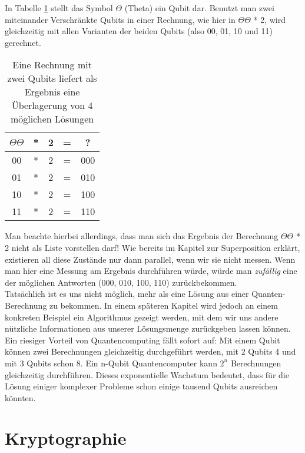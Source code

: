 \documentclass[12pt]{IEEEtran}
\begin{document}
In Tabelle \ref{tab:QubitRechnung} stellt das Symbol \(\Theta\) (Theta) ein Qubit dar. Benutzt man zwei miteinander Verschränkte Qubits in einer Rechnung, wie hier in \(\Theta\Theta\) * 2, wird gleichzeitig mit allen Varianten der beiden Qubits (also 00, 01, 10 und 11) gerechnet.

\begin{table}
    \centering
    \caption{Eine Rechnung mit zwei Qubits liefert als Ergebnis eine Überlagerung von 4 möglichen Lösungen}
    \label{tab:QubitRechnung}
    \begin{tabular}{ccccc}
        \(\Theta\Theta\) & * & 2 & = & ?\\
        \hline
        00 & * & 2 & = & 000\\
        01 & * & 2 & = & 010\\
        10 & * & 2 & = & 100\\
        11 & * & 2 & = & 110\\
    \end{tabular}
\end{table}

Man beachte hierbei allerdings, dass man sich das Ergebnis der Berechnung \(\Theta\Theta\) * 2 nicht als Liste vorstellen darf! Wie bereits im Kapitel zur Superposition erklärt, existieren all diese Zustände nur dann parallel, wenn wir sie nicht messen. Wenn man hier eine Messung am Ergebnis durchführen würde, würde man \textit{zufällig} eine der möglichen Antworten (000, 010, 100, 110) zurückbekommen. \\

Tatsächlich ist es uns nicht möglich, mehr als eine Lösung aus einer Quanten-Berechnung zu bekommen. In einem späteren Kapitel wird jedoch an einem konkreten Beispiel ein Algorithmus gezeigt werden, mit dem wir uns andere nützliche Informationen aus unserer Lösungsmenge zurückgeben lassen können.\\

Ein riesiger Vorteil von Quantencomputing fällt sofort auf: Mit einem Qubit können zwei Berechnungen gleichzeitig durchgeführt werden, mit 2 Qubits 4 und mit 3 Qubits schon 8. Ein n-Qubit Quantencomputer kann \(2^n\) Berechnungen gleichzeitig durchführen. Dieses exponentielle Wachstum bedeutet, dass für die Lösung einiger komplexer Probleme schon einige tausend Qubits ausreichen könnten. \cite{mavroeidis2018impact}

\section{Kryptographie}
\end{document}
